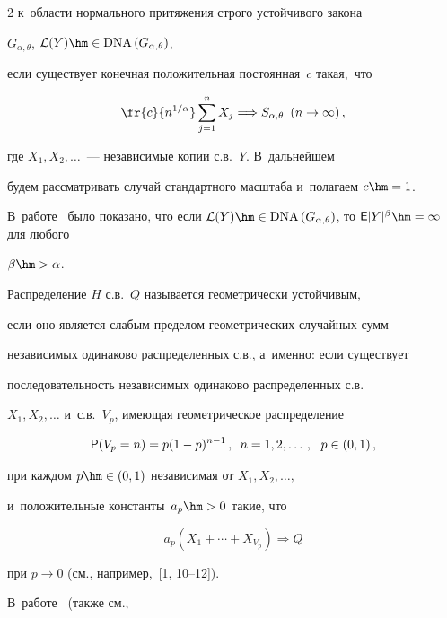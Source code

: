 \begin{multicols}{2}
к~области нормального притяжения строго устойчивого закона


$G_{\alpha,\theta}$, $\mathcal{L}(Y)\hm\in \mathrm{DNA}\left(G_{\alpha,\theta}\right)$,


если существует конечная положительная постоянная~$c$ та\-кая,~что


$$


\fr{c}{n^{1/\alpha}}\sum\limits_{j=1}^nX_j\Longrightarrow


S_{\alpha,\theta}\enskip (n\to\infty)\,,


$$


где $X_1,X_2,\ldots$~--- независимые копии с.в.~$Y$. В~дальнейшем


будем рассматривать случай стандартного масштаба и~полагаем $c\hm=1$. 


В~работе~\cite{Tucker1975} было показано, что если $\mathcal{L}(Y)\hm\in


\mathrm{DNA}\left(G_{\alpha,\theta}\right)$, то ${\sf E}|Y|^{\beta}\hm=\infty$ для любого


$\beta\hm>\alpha$.





Распределение $H$ с.в.~$Q$ называется геометрически устойчивым,


если оно является слабым пределом геометрических случайных сумм


независимых одинаково распределенных с.в., а~именно: если существует


последовательность независимых одинаково распределенных с.в.\


$X_1,X_2,\ldots$ и~с.в.~$V_p$, имеющая геометрическое распределение


\begin{equation*}


{\sf P}(V_p=n)=p(1-p)^{n-1}\,,\enskip n=1,2,\ldots\,,\ \  p\in(0,1)\,,




\end{equation*}


при каждом $p\hm\in(0,1)$ независимая от $X_1,X_2,\ldots,$ 


и~положительные константы~$a_p\hm>0$ такие, что


$$


a_p\left(X_1+\cdots+X_{V_p}\right)\Longrightarrow Q


$$


при $p\to 0$ (см., например,~[1, 10--12]). 


В~работе~\cite{KlebanovManiaMelamed1984} (также см., 



\end{multicols}

